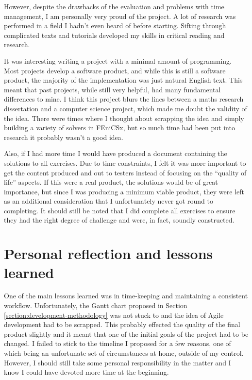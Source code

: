 \begin{appendices}
However, despite the drawbacks of the evaluation and problems with time management, I am personally very proud of the project. A lot of research was performed in a field I hadn't even heard of before starting. Sifting through complicated texts and tutorials developed my skills in critical reading and research.

It was interesting writing a project with a minimal amount of programming. Most projects develop a software product, and while this is still a software product, the majority of the implementation was just natural English text. This meant that past projects, while still very helpful, had many fundamental differences to mine. I think this project blurs the lines between a maths research dissertation and a computer science project, which made me doubt the validity of the idea. There were times where I thought about scrapping the idea and simply building a variety of solvers in FEniCSx, but so much time had been put into research it probably wasn't a good idea.

Also, if I had more time I would have produced a document containing the solutions to all exercises. Due to time constraints, I felt it was more important to get the content produced and out to testers instead of focusing on the ``quality of life'' aspects. If this were a real product, the solutions would be of great importance, but since I was producing a minimum viable product, they were left as an additional consideration that I unfortunately never got round to completing. It should still be noted that I did complete all exercises to ensure they had the right degree of challenge and were, in fact, soundly constructed.

\section{Personal reflection and lessons learned}

One of the main lessons learned was in time-keeping and maintaining a consistent workflow. Unfortunately, the Gantt chart proposed in Section \ref{section:development-methodology} was not stuck to and the idea of Agile development had to be scrapped. This probably effected the quality of the final product slightly and it meant that one of the initial goals of the project had to be changed. I failed to stick to the timeline I proposed for a few reasons, one of which being an unfortunate set of circumstances at home, outside of my control. However, I should still take some personal responsibility in the matter and I know I could have devoted more time at the beginning.


\end{appendices}
